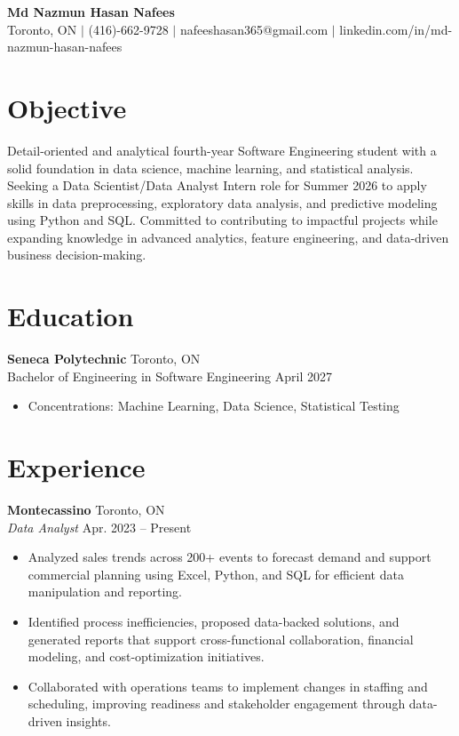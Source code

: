 \documentclass[11pt,letterpaper]{article}
\begin{document}
\begin{center}
{\LARGE \textbf{Md Nazmun Hasan Nafees}}\\[4pt]
Toronto, ON $\vert$ (416)-662-9728 $\vert$ nafeeshasan365@gmail.com $\vert$ linkedin.com/in/md-nazmun-hasan-nafees
\end{center}

\section*{Objective}
Detail-oriented and analytical fourth-year Software Engineering student with a solid foundation in data science, machine learning, and statistical analysis. Seeking a Data Scientist/Data Analyst Intern role for Summer 2026 to apply skills in data preprocessing, exploratory data analysis, and predictive modeling using Python and SQL. Committed to contributing to impactful projects while expanding knowledge in advanced analytics, feature engineering, and data-driven business decision-making.

\section*{Education}
\textbf{Seneca Polytechnic} \hfill Toronto, ON\\
Bachelor of Engineering in Software Engineering \hfill April 2027
\begin{itemize}[leftmargin=*,noitemsep,topsep=2pt]
    \item Concentrations: Machine Learning, Data Science, Statistical Testing
\end{itemize}

\section*{Experience}
\textbf{Montecassino} \hfill Toronto, ON\\
\textit{Data Analyst} \hfill Apr. 2023 -- Present
\begin{itemize}[leftmargin=*,noitemsep,topsep=2pt]
    \item Analyzed sales trends across 200+ events to forecast demand and support commercial planning using Excel, Python, and SQL for efficient data manipulation and reporting.
    \item Identified process inefficiencies, proposed data-backed solutions, and generated reports that support cross-functional collaboration, financial modeling, and cost-optimization initiatives.
    \item Collaborated with operations teams to implement changes in staffing and scheduling, improving readiness and stakeholder engagement through data-driven insights.
\end{itemize}
\end{document}
